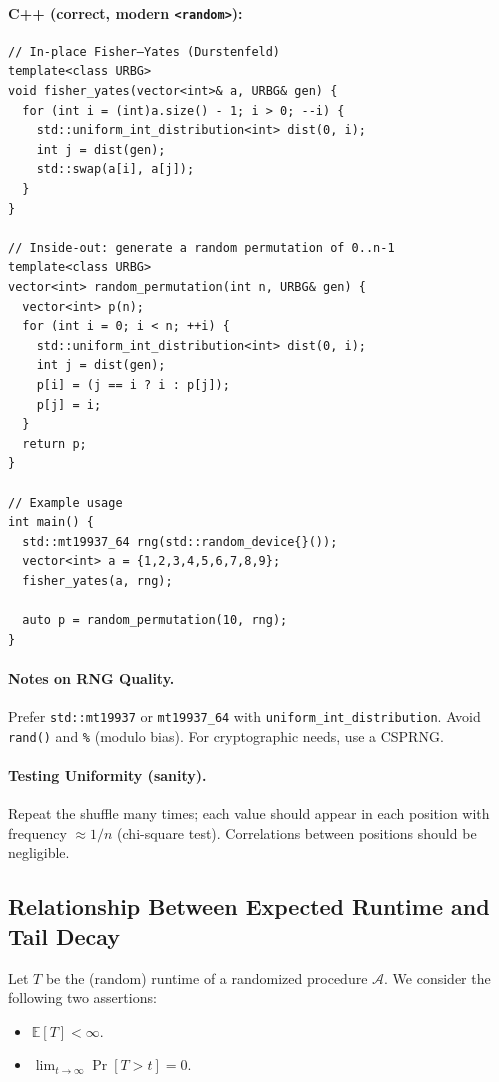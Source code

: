 \documentclass[9pt]{extarticle}
\begin{document}
\paragraph{C++ (correct, modern \texttt{<random>}):}
\begin{verbatim}
// In-place Fisher–Yates (Durstenfeld)
template<class URBG>
void fisher_yates(vector<int>& a, URBG& gen) {
  for (int i = (int)a.size() - 1; i > 0; --i) {
    std::uniform_int_distribution<int> dist(0, i);
    int j = dist(gen);
    std::swap(a[i], a[j]);
  }
}

// Inside-out: generate a random permutation of 0..n-1
template<class URBG>
vector<int> random_permutation(int n, URBG& gen) {
  vector<int> p(n);
  for (int i = 0; i < n; ++i) {
    std::uniform_int_distribution<int> dist(0, i);
    int j = dist(gen);
    p[i] = (j == i ? i : p[j]);
    p[j] = i;
  }
  return p;
}

// Example usage
int main() {
  std::mt19937_64 rng(std::random_device{}());
  vector<int> a = {1,2,3,4,5,6,7,8,9};
  fisher_yates(a, rng);

  auto p = random_permutation(10, rng);
}
\end{verbatim}

\paragraph{Notes on RNG Quality.}
Prefer \texttt{std::mt19937} or \texttt{mt19937\_64} with \texttt{uniform\_int\_distribution}. Avoid \texttt{rand()} and \texttt{\%} (modulo bias). For cryptographic needs, use a CSPRNG.

\paragraph{Testing Uniformity (sanity).}
Repeat the shuffle many times; each value should appear in each position with frequency $\approx 1/n$ (chi-square test). Correlations between positions should be negligible.
\subsection{Relationship Between Expected Runtime and Tail Decay}

Let $T$ be the (random) runtime of a randomized procedure $\mathcal{A}$.  
We consider the following two assertions:

\begin{itemize}
    \item[A1.] $\mathbb{E}[T] < \infty$.
    \item[A2.] $\displaystyle \lim_{t \to \infty} \Pr[T > t] = 0$.
\end{itemize}
\end{document}
